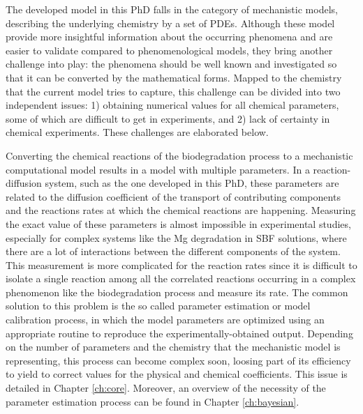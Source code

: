 The developed model in this PhD falls in the category of mechanistic models, describing the underlying chemistry by a set of PDEs. Although these model provide more insightful information about the occurring phenomena and are easier to validate compared to phenomenological models, they bring another challenge into play: the phenomena should be well known and investigated so that it can be converted by the mathematical forms. Mapped to the chemistry that the current model tries to capture, this challenge can be divided into two independent issues: 1) obtaining numerical values for all chemical parameters, some of which are difficult to get in experiments, and 2) lack of certainty in chemical experiments. These challenges are elaborated below.

Converting the chemical reactions of the biodegradation process to a mechanistic computational model results in a model with multiple parameters. In a reaction-diffusion system, such as the one developed in this PhD, these parameters are related to the diffusion coefficient of the transport of contributing components and the reactions rates at which the chemical reactions are happening. Measuring the exact value of these parameters is almost impossible in experimental studies, especially for complex systems like the Mg degradation in SBF solutions, where there are a lot of interactions between the different components of the system. This measurement is more complicated for the reaction rates since it is difficult to isolate a single reaction among all the correlated reactions occurring in a complex phenomenon like the biodegradation process and measure its rate. The common solution to this problem is the so called parameter estimation or model calibration process, in which the model parameters are optimized using an appropriate routine to reproduce the experimentally-obtained output. Depending on the number of parameters and the chemistry that the mechanistic model is representing, this process can become complex soon, loosing part of its efficiency to yield to correct values for the physical and chemical coefficients. This issue is detailed in Chapter \ref{ch:core}. Moreover, an overview of the necessity of the parameter estimation process can be found in Chapter \ref{ch:bayesian}.

